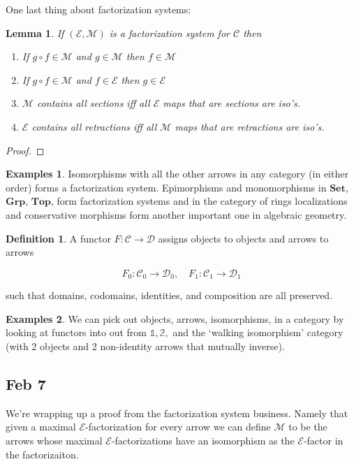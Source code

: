 \documentclass[11pt]{amsart}
\theoremstyle{plain}
\newtheorem{lem}[thm]{Lemma}
\theoremstyle{definition}
\newtheorem{defn}[thm]{Definition}
\newtheorem*{egs*}{Examples}
\newcommand{\cC}{{\mathcal C}}
\newcommand{\cD}{{\mathcal D}}
\newcommand{\cE}{{\mathcal E}}
\newcommand{\cM}{{\mathcal M}}
\newcommand{\Top}{\mathbf{Top}}
\newcommand{\Set}{{\mathbf{Set}}}
\newcommand{\Grp}{\mathbf{Grp}}
\newcommand{\noi}{{\noindent}}
\begin{document}
One last thing about factorization systems: 

\begin{lem}
If $(\cE, \cM)$ is a factorization system for $\cC$ then 

\begin{enumerate}
\item If $g \circ f \in \cM$ and $g \in \cM$ then $f \in \cM$
\item If $g \circ f \in \cM$ and $f \in \cE$ then $g \in \cE$
\item $\cM$ contains all sections iff all $\cE$ maps that are sections are iso's. 
\item $\cE$ contains all retractions iff all $\cM$ maps that are retractions are iso's. 
\end{enumerate}
\end{lem}
\begin{proof}
\end{proof}

\begin{egs*}
Isomorphisms with all the other arrows in any category (in either order) forms a factorization system. Epimorphisms and monomorphisms in $\Set$, $\Grp$, $\Top$, form factorization systems and in the category of rings localizations and conservative morphisms form another important one in algebraic geometry. 
\end{egs*}

\begin{defn}
A functor $F : \cC \to \cD$ assigns objects to objects and arrows to arrows 

\[ F_0 : \cC_0 \to \cD_0 , \quad F_1 : \cC_1 \to \cD_1\]

\noi such that domains, codomains, identities, and composition are all preserved. 
\end{defn}

\begin{egs*}
We can pick out objects, arrows, isomorphisms, in a category by looking at functors into out from $\mathbb{1}, \mathbb{2},$ and the `walking isomorphism' category (with 2 objects and 2 non-identity arrows that mutually inverse). 
\end{egs*}




\subsection{Feb 7}

We're wrapping up a proof from the factorization system business. Namely that given a maximal $\cE$-factorization for every arrow we can define $\cM$ to be the arrows whose maximal $\cE$-factorizations have an isomorphism as the $\cE$-factor in the factorizaiton. \medskip 
\end{document}
